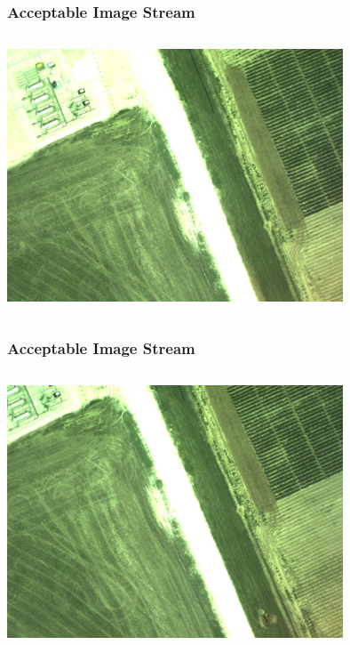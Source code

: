 \documentclass{beamer}
\begin{document}
\begin{frame}
\frametitle{Acceptable Image Stream}
\begin{columns}
\begin{centering}
\includegraphics[width = 10cm]{Figures/good3}
\end{centering}
\end{columns}
\end{frame}


\begin{frame}
\frametitle{Acceptable Image Stream}
\begin{columns}
\begin{centering}
\includegraphics[width = 10cm]{Figures/good4}
\end{centering}
\end{columns}
\end{frame}
\end{document}
